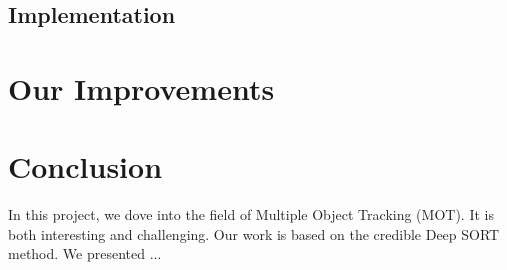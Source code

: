 \documentclass[conference]{IEEEtran}
\begin{document}
\subsection{Implementation}



\section{Our Improvements}

\section{Conclusion}

In this project, we dove into the field of Multiple Object Tracking (MOT). It is both interesting and challenging. Our work is based on the credible Deep SORT method. We presented ...



\end{document}
